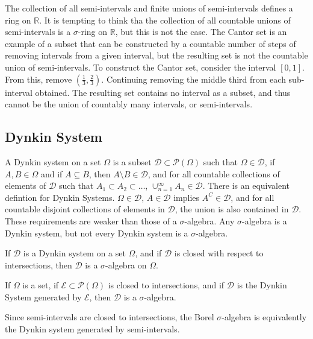 \documentclass[crop=false,class=book,oneside]{standalone}
\begin{document}
            \begin{example}
                The collection of all semi-intervals and finite
                unions of semi-intervals defines a ring on
                $\mathbb{R}$. It is tempting to think tha the
                collection of all countable unions of semi-intervals
                is a $\sigma$-ring on $\mathbb{R}$, but this is not
                the case. The Cantor set is an example of a subset
                that can be constructed by a countable number of
                steps of removing intervals from a given interval,
                but the resulting set is not the countable union of
                semi-intervals. To construct the Cantor set, consider
                the interval $[0,1]$. From this, remove
                $(\frac{1}{3},\frac{2}{3})$. Continuing removing the
                middle third from each sub-interval obtained. The
                resulting set contains no interval as a subset, and
                thus cannot be the union of countably many intervals,
                or semi-intervals.
            \end{example}
        \subsection{Dynkin System}
            A Dynkin system on a set $\Omega$ is a subset
            $\mathcal{D}\subset\mathcal{P}(\Omega)$ such that
            $\Omega\in\mathcal{D}$, if $A,B\in\Omega$ and if
            $A\subseteq{B}$, then $A\setminus{B}\in\mathcal{D}$,
            and for all countable collections of elements of
            $\mathcal{D}$ such that
            $A_{1}\subset{A}_{2}\subset\hdots$,
            $\cup_{n=1}^{\infty}A_{n}\in\mathcal{D}$. There is
            an equivalent defintion for Dynkin Systems.
            $\Omega\in\mathcal{D}$, $A\in\mathcal{D}$ implies
            $A^{C}\in\mathcal{D}$, and for all countable disjoint
            collections of elements in $\mathcal{D}$, the union
            is also contained in $\mathcal{D}$. These requirements
            are weaker than those of a $\sigma$-algebra. Any
            $\sigma$-algebra is a Dynkin system, but not every
            Dynkin system is a $\sigma$-algebra.
            \begin{theorem}
                If $\mathcal{D}$ is a Dynkin system on a set
                $\Omega$, and if $\mathcal{D}$ is closed with
                respect to intersections, then $\mathcal{D}$
                is a $\sigma$-algebra on $\Omega$.
            \end{theorem}
            \begin{theorem}
                If $\Omega$ is a set, if
                $\mathcal{E}\subset\mathcal{P}(\Omega)$ is closed
                to intersections, and if $\mathcal{D}$ is the
                Dynkin System generated by $\mathcal{E}$, then
                $\mathcal{D}$ is a $\sigma$-algebra.
            \end{theorem}
            Since semi-intervals are closed to intersections,
            the Borel $\sigma$-algebra is equivalently the
            Dynkin system generated by semi-intervals.
\end{document}
